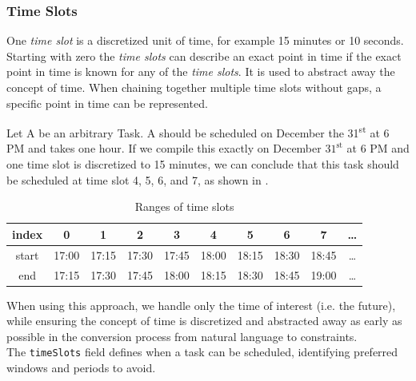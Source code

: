 \subsubsection*{Time Slots}
\label{subsubsec:methodology-language-design:time-slots}
One \emph{time slot} is a discretized unit of time, for example 15 minutes or 10 seconds. Starting with zero the \emph{time slots} can describe an exact point in time if the exact point in time is known for any of the \emph{time slots}. It is used to abstract away the concept of time. When chaining together multiple time slots without gaps, a specific point in time can be represented.
\begin{example}
    \label{ex:time-slots}
    Let A be an arbitrary Task. A should be scheduled on December the 31\textsuperscript{st} at 6 PM and takes one hour. If we compile this exactly on December $31^{\text{st}}$ at 6 PM and one time slot is discretized to 15 minutes, we can conclude that this task should be scheduled at time slot 4, 5, 6, and 7, as shown in .

    \begin{table}[!ht]
        \centering
        \begin{tabular}{|c|c|c|c|c|c|c|c|c|c|}
            \hline
            index & 0     & 1     & 2     & 3     & 4     & 5     & 6     & 7     & \dots \\
            \hline
            start & 17:00 & 17:15 & 17:30 & 17:45 & 18:00 & 18:15 & 18:30 & 18:45 & \dots \\
            \hline
            end   & 17:15 & 17:30 & 17:45 & 18:00 & 18:15 & 18:30 & 18:45 & 19:00 & \dots \\
            \hline
        \end{tabular}
        \caption{Ranges of time slots}
        \label{tab:methodology-language-design:time-slots}
    \end{table}
\end{example}
When using this approach, we handle only the time of interest (i.e. the future), while ensuring the concept of time is discretized and abstracted away as early as possible in the conversion process from natural language to constraints. \\
The \texttt{timeSlots} field defines when a task can be scheduled, identifying preferred windows and periods to avoid.

